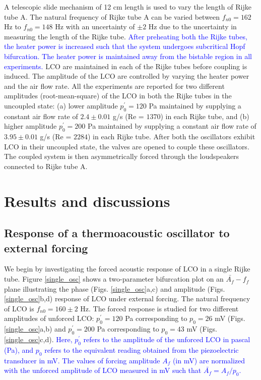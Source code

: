 \documentclass[%
preprint,
 amsmath,amssymb,
 aps,
 pra,
]{revtex4-2}
\begin{document}
A telescopic slide mechanism of 12 cm length is used to vary the length of Rijke tube A. The natural frequency of Rijke tube A can be varied between $f_{n0} = 162 $ Hz to $f_{n0} = 148 $ Hz with an uncertainty of $\pm 2$ Hz due to the uncertainty in measuring the length of the Rijke tube. \textcolor{blue}{After preheating both the Rijke tubes, the heater power is increased such that the system undergoes subcritical Hopf bifurcation. The heater power is maintained away from the bistable region in all experiments.} LCO are maintained in each of the Rijke tubes before coupling is induced. The amplitude of the LCO are controlled by varying the heater power and the air flow rate. All the experiments are reported for two different amplitudes (root-mean-square) of the LCO in both the Rijke tubes in the uncoupled state: (a) lower amplitude $p^\prime_{0} = 120$ Pa maintained by supplying a constant air flow rate of $2.4 \pm 0.01$ g/s (Re = $1370$) in each Rijke tube, and (b) higher amplitude $p^\prime_{0} = 200$ Pa maintained by supplying a constant air flow rate of $3.95 \pm 0.01$ g/s (Re = $2284$) in each Rijke tube. After both the oscillators exhibit LCO in their uncoupled state, the valves are opened to couple these oscillators. The coupled system is then asymmetrically forced through the loudspeakers connected to Rijke tube A. 


\section{Results and discussions}
\label{3. Results and discussions}

\subsection{Response of a thermoacoustic oscillator to external forcing}
\label{Results:1}
We begin by investigating the forced acoustic response of  LCO in a single Rijke tube. Figure \ref{single_osc} shows a two-parameter bifurcation plot on an $\bar{A_f}-f_f$ plane illustrating the phase (Figs. \ref{single_osc}a,c) and amplitude (Figs. \ref{single_osc}b,d) response of LCO under external forcing. The natural frequency of LCO is $f_{n0}=160 \pm 2$ Hz. The forced response is studied for two different amplitudes of unforced LCO: $p^\prime_{0}=120$ Pa corresponding to $p_{0}=26$ mV (Figs. \ref{single_osc}a,b) and $p^\prime_{0}=200$ Pa corresponding to $p_{0}=43$ mV (Figs. \ref{single_osc}c,d). \textcolor{blue}{Here, $p^\prime_{0}$ refers to the amplitude of the unforced LCO in pascal (Pa), and $p_{0}$ refers to the equivalent reading obtained from the piezoelectric transducer in mV. The values of forcing amplitude  $A_f$ (in mV) are normalized with the unforced amplitude of LCO measured in mV such that $\bar{A_f} = A_f/p_0$.}
\end{document}
